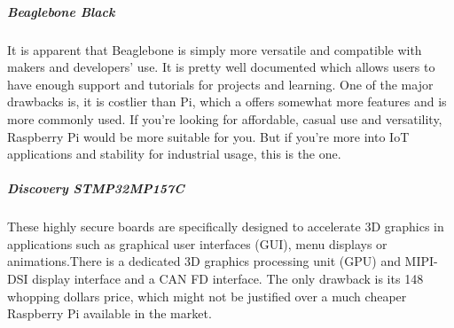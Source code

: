 \documentclass[a4paper,11pt]{article}
\begin{document}
\begin{iotsolution}
\subparagraph{Beaglebone Black}  It is apparent that Beaglebone is simply more versatile and compatible with makers and developers’ use. It is pretty well documented which allows users to have enough support and tutorials for projects and learning. One of the major drawbacks is, it is costlier than Pi, which a offers somewhat more features and is more commonly used.  If you’re looking for affordable, casual use and versatility, Raspberry Pi would be more suitable for you. But if you’re more into IoT applications and stability for industrial usage, this is the one. 

\subparagraph{Discovery STMP32MP157C}These highly secure boards are specifically designed to accelerate 3D graphics in applications such as graphical user interfaces (GUI), menu displays or animations.There is a dedicated 3D graphics processing unit (GPU) and MIPI-DSI display interface and a CAN FD interface. The only drawback is its 148 whopping dollars price, which might not be justified over a much cheaper Raspberry Pi available in the market.



\end{iotsolution}
\end{document}

